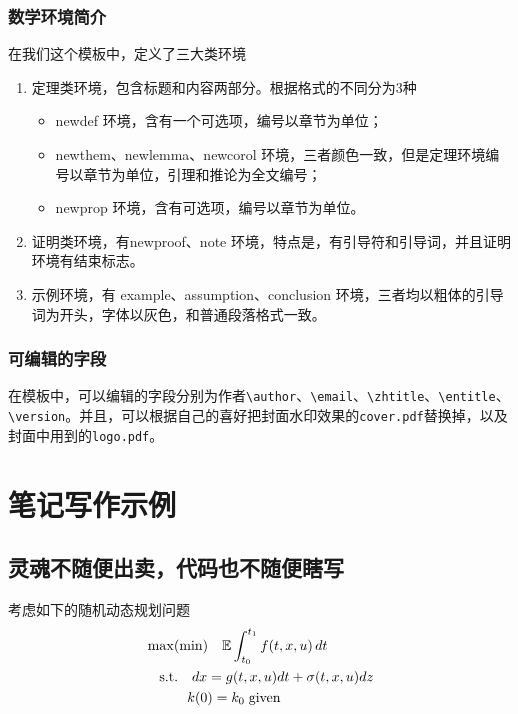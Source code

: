 \documentclass[cyan]{elegantnote}
\begin{document}
\subsection{数学环境简介}
在我们这个模板中，定义了三大类环境
\begin{enumerate}
\item 定理类环境，包含标题和内容两部分。根据格式的不同分为3种
\begin{itemize}
\item {\color{main} newdef} 环境，含有一个可选项，编号以章节为单位；
\item {\color{main}newthem、newlemma、newcorol} 环境，三者颜色一致，但是定理环境编号以章节为单位，引理和推论为全文编号；
\item newprop 环境，含有可选项，编号以章节为单位。
\end{itemize}
\item 证明类环境，有{\color{main}newproof、note} 环境，特点是，有引导符和引导词，并且证明环境有结束标志。
\item 示例环境，有{\color{main} example、assumption、conclusion} 环境，三者均以粗体的引导词为开头，字体以灰色，和普通段落格式一致。
\end{enumerate}

\subsection{可编辑的字段}
在模板中，可以编辑的字段分别为作者\verb|\author|、\verb|\email|、\verb|\zhtitle|、\verb|\entitle|、\verb|\version|。并且，可以根据自己的喜好把封面水印效果的\verb|cover.pdf|替换掉，以及封面中用到的\verb|logo.pdf|。

\chapter{笔记写作示例}

\section{灵魂不随便出卖，代码也不随便瞎写}
\lipsum[3]
考虑如下的随机动态规划问题
\begin{align*}
&\max(\min)\quad \mathbb{E}\int_{t_0}^{t_1}f(t,x,u)\,dt\\
&\quad\mbox{s.t.} \quad dx=g(t,x,u)dt+\sigma(t,x,u)dz\\
&\quad \hspace{2.em} k(0)=k_0\;\text{given}
\end{align*}
\end{document}
